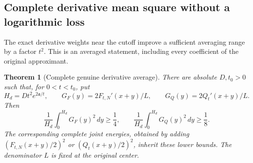 \documentclass[11pt]{article}
\numberwithin{equation}{section}
\newtheorem{theorem}{Theorem}[section]
\theoremstyle{definition}
\theoremstyle{remark}
\newcommand{\dd}{\,d}
\begin{document}
\subsection{Complete derivative mean square without a logarithmic loss}

The exact derivative weights near the cutoff improve a sufficient
averaging range by a factor \(t^2\). This is an averaged statement,
including every coefficient of the original approximant.

\begin{theorem}[Complete genuine derivative average]
\label{lj:derivativeaverage}
There are absolute \(D,t_0>0\) such that, for \(0<t<t_0\), put
\[
 H_d=Dt^2e^{2\mathfrak a/t},\qquad
 G_F(y)=2F_{t,N}'(x+y)/L,\qquad G_Q(y)=2Q_t'(x+y)/L.
\]
Then
\begin{equation}\label{lj:averagelower}
 \frac1{H_d}\int_0^{H_d}G_F(y)^2\dd y\ge\frac14,\qquad
 \frac1{H_d}\int_0^{H_d}G_Q(y)^2\dd y\ge\frac18.
\end{equation}
The corresponding complete joint energies, obtained by adding
\((F_{t,N}(x+y)/2)^2\) or \((Q_t(x+y)/2)^2\), inherit these lower
bounds. The denominator \(L\) is fixed at the original center.
\end{theorem}
\end{document}
